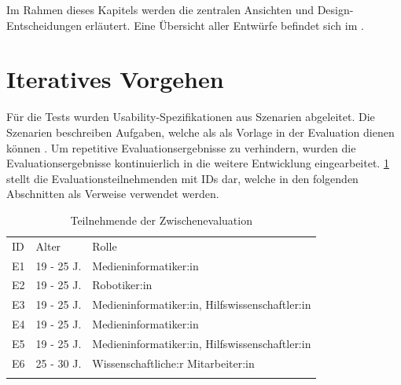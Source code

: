 Im Rahmen dieses Kapitels werden die zentralen Ansichten und
Design-Entscheidungen erläutert. Eine Übersicht aller Entwürfe befindet sich im
.

\section{Iteratives Vorgehen}
Für die Tests wurden Usability-Spezifikationen aus Szenarien abgeleitet. Die
Szenarien beschreiben Aufgaben, welche als als Vorlage in der Evaluation dienen
können . Um repetitive
Evaluationsergebnisse zu verhindern, wurden die Evaluationsergebnisse
kontinuierlich in die weitere Entwicklung eingearbeitet. \ref{table:e} stellt
die Evaluationsteilnehmenden mit IDs dar, welche in den folgenden Abschnitten
als Verweise verwendet werden.

\begin{table}[h]
    \centering
    \caption{Teilnehmende der Zwischenevaluation}
    \begin{tabular}{lll}
        \arrayrulecolor{maincolor}\hline
        \sffamily\color{maincolor}ID & \sffamily\color{maincolor}Alter &
        \sffamily\color{maincolor}Rolle
        \\
        \arrayrulecolor{maincolor}\hline
        E1                           & 19 - 25 J.                      &
        Medieninformatiker:in
        \\
        E2                           & 19 - 25 J.                      &
        Robotiker:in                                                     \\
        E3                           & 19 - 25 J.                      &
        Medieninformatiker:in, Hilfswissenschaftler:in                   \\
        E4                           & 19 - 25 J.                      &
        Medieninformatiker:in                                            \\
        E5                           & 19 - 25 J.                      &
        Medieninformatiker:in, Hilfswissenschaftler:in
        \\
        E6                           & 25 - 30 J.                      &
        Wissenschaftliche:r Mitarbeiter:in                               \\
        \arrayrulecolor{maincolor}\hline
    \end{tabular}
    \label{table:e}
\end{table}

